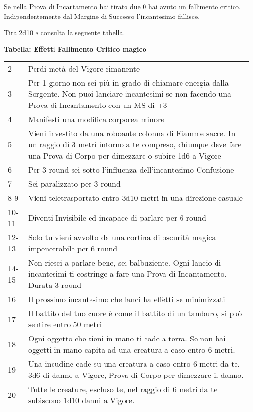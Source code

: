 \documentclass[12pt,a4paper,twoside,openany]{book}
\begin{document}
\begin{multicols}{2}
Se nella Prova di Incantamento hai tirato due 0 hai avuto un fallimento critico. Indipendentemente dal Margine di Successo l'incantesimo fallisce.

Tira 2d10 e consulta la seguente tabella.


\textbf{Tabella: Effetti Fallimento Critico magico}

\medskip
{\small
	\begin{tabularx}{0.45\textwidth}{lX}
		\hline
2 & Perdi metà del Vigore rimanente\\
3 & Per 1 giorno non sei più in grado di chiamare energia dalla Sorgente. Non puoi lanciare incantesimi se non facendo una Prova di Incantamento con un MS di +3\\
4 & Manifesti una modifica corporea minore\\
5 & Vieni investito da una roboante colonna di Fiamme sacre. In un raggio di 3 metri intorno a te compreso, chiunque deve fare una Prova di Corpo per dimezzare o subire 1d6 a Vigore\\
6 & Per 3 round sei sotto l'influenza dell'incantesimo Confusione\\
7 & Sei paralizzato per 3 round\\
8-9 & Vieni teletrasportato entro 3d10 metri in una direzione casuale\\
10-11 & Diventi Invisibile ed incapace di parlare per 6 round\\
12-13 &  Solo tu vieni avvolto da una cortina di oscurità magica impenetrabile per 6 round\\
14-15 & Non riesci a parlare bene, sei balbuziente. Ogni lancio di incantesimi ti costringe a fare una Prova di Incantamento. Durata 3 round\\
16 & Il prossimo incantesimo che lanci ha effetti se minimizzati\\
17 & Il battito del tuo cuore è come il battito di un tamburo, si può sentire entro 50 metri\\
18 & Ogni oggetto che tieni in mano ti cade a terra. Se non hai oggetti in mano capita ad una creatura a caso entro 6 metri.\\
19 & Una incudine cade su una creatura a caso entro 6 metri da te. 3d6 di danno a Vigore, Prova di Corpo per dimezzare il danno.\\
20 & Tutte le creature, escluso te, nel raggio di 6 metri da te subiscono 1d10 danni a Vigore.
\end{tabularx}}


\end{multicols}
\end{document}
